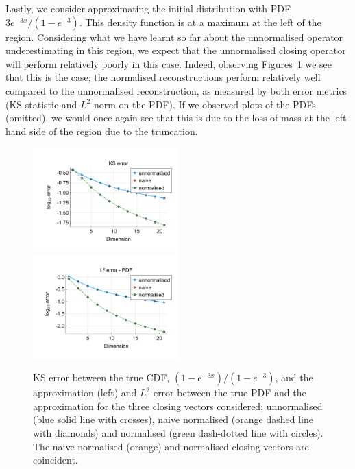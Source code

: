 \begin{example}Lastly, we consider approximating the initial distribution with PDF \(3e^{-3x}/(1-e^{-3})\). This density function is at a maximum at the left of the region. Considering what we have learnt so far about the unnormalised operator underestimating in this region, we expect that the unnormalised closing operator will perform relatively poorly in this case. Indeed, observing Figures~\ref{fig: fun 7 ks error qbdrap closing vecs} we see that this is the case; the normalised reconstructions perform relatively well compared to the unnormalised reconstruction, as measured by both error metrics (KS statistic and \(L^2\) norm on the PDF). If we observed plots of the PDFs (omitted), we would once again see that this is due to the loss of mass at the left-hand side of the region due to the truncation. 
\begin{figure}[h]
	\centering
	\includegraphics[width=0.5\textwidth,trim={1.25cm 0.8cm 0.25cm 1.25cm},clip]{chapter6/figs/qbdrap_closing_vec/fun7/ks_error_formatted.pdf}%
	\includegraphics[width=0.5\textwidth,trim={1.25cm 0.8cm 0.25cm 1.25cm},clip]{chapter6/figs/qbdrap_closing_vec/fun7/l2_pdf_error_formatted.pdf}
	\caption{KS error between the true CDF, \((1-e^{-3x})/(1-e^{-3})\), and the approximation (left) and \(L^2\) error between the true PDF and the approximation for the three closing vectors considered; unnormalised (blue solid line with crosses), naive normalised (orange dashed line with diamonds) and normalised (green dash-dotted line with circles). The naive normalised (orange) and normalised closing vectors are coincident.}
	\label{fig: fun 7 ks error qbdrap closing vecs}
\end{figure}
\exampleFloatBarrier
\end{example}


